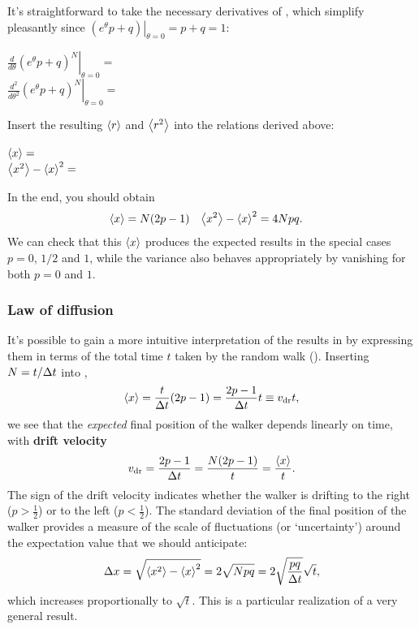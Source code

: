 \newpage %
It's straightforward to take the necessary derivatives of , which simplify pleasantly since $\left.\left(e^{\theta} p + q\right) \right|_{\theta = 0} = p + q = 1$:
\begin{mdframed}
  $\displaystyle \left.\frac{d}{d\theta} \left(e^{\theta} p + q\right)^N \right|_{\theta = 0} = $ \\[50 pt]
  $\displaystyle \left.\frac{d^2}{d\theta^2} \left(e^{\theta} p + q\right)^N \right|_{\theta = 0} = $ \\[75 pt]
\end{mdframed}
Insert the resulting $\left\langle r \right\rangle$ and $\left\langle r^2 \right\rangle$ into the relations derived above:
\begin{mdframed}
  $\left\langle x \right\rangle = $ \\[50 pt]
  $\left\langle x^2 \right\rangle - \left\langle x \right\rangle^2 = $ \\[50 pt]
\end{mdframed}
In the end, you should obtain %
\begin{align}
  \label{eq:RWmean}
  \left\langle x \right\rangle & = N(2p - 1) &
  \left\langle x^2 \right\rangle - \left\langle x \right\rangle^2 & = 4Npq.
\end{align}
We can check that this $\left\langle x \right\rangle$ produces the expected results in the special cases $p = 0$, $1 / 2$ and $1$, while the variance also behaves appropriately by vanishing for both $p = 0$ and $1$.



\subsubsection{Law of diffusion}
It's possible to gain a more intuitive interpretation of the results in  by expressing them in terms of the total time $t$ taken by the random walk ().
Inserting $N = t / \Delta t$ into ,
\begin{equation*}
  \left\langle x \right\rangle = \frac{t}{\Delta t} (2p - 1) = \frac{2p - 1}{\Delta t} t \equiv v_{\mathrm{dr}} t,
\end{equation*}
we see that the \textit{expected} final position of the walker depends linearly on time, with \textbf{drift velocity}
\begin{equation}
  v_{\mathrm{dr}} = \frac{2p - 1}{\Delta t} = \frac{N(2p - 1)}{t} = \frac{\left\langle x \right\rangle}{t}.
\end{equation}
The sign of the drift velocity indicates whether the walker is drifting to the right ($p > \frac{1}{2}$) or to the left ($p < \frac{1}{2}$).
The standard deviation of the final position of the walker provides a measure of the scale of fluctuations (or `uncertainty') around the expectation value that we should anticipate:
\begin{equation*}
  \Delta x = \sqrt{\left\langle x^2 \right\rangle - \left\langle x \right\rangle^2} = 2\sqrt{Npq} = 2\sqrt{\frac{pq}{\Delta t}} \sqrt{t},
\end{equation*}
which increases proportionally to $\sqrt{t}$.
This is a particular realization of a very general result.

